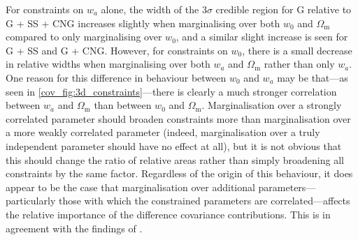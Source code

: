 For constraints on $w_a$ alone, the width of the $3\sigma$ credible region for G relative to G + SS + CNG increases slightly when marginalising over both $w_0$ and $\Omega_\text{m}$ compared to only marginalising over $w_0$, and a similar slight increase is seen for G + SS and G + CNG. However, for constraints on $w_0$, there is a small decrease in relative widths when marginalising over both $w_a$ and $\Omega_\text{m}$ rather than only $w_a$. One reason for this difference in behaviour between $w_0$ and $w_a$ may be that---as seen in \autoref{cov_fig:3d_constraints}---there is clearly a much stronger correlation between $w_a$ and $\Omega_\text{m}$ than between $w_0$ and $\Omega_\text{m}$. Marginalisation over a strongly correlated parameter should broaden constraints more than marginalisation over a more weakly correlated parameter (indeed, marginalisation over a truly independent parameter should have no effect at all), but it is not obvious that this should change the ratio of relative areas rather than simply broadening all constraints by the same factor. Regardless of the origin of this behaviour, it does appear to be the case that marginalisation over additional parameters---particularly those with which the constrained parameters are correlated---affects the relative importance of the difference covariance contributions. This is in agreement with the findings of \citet{Barreira2018b}.


